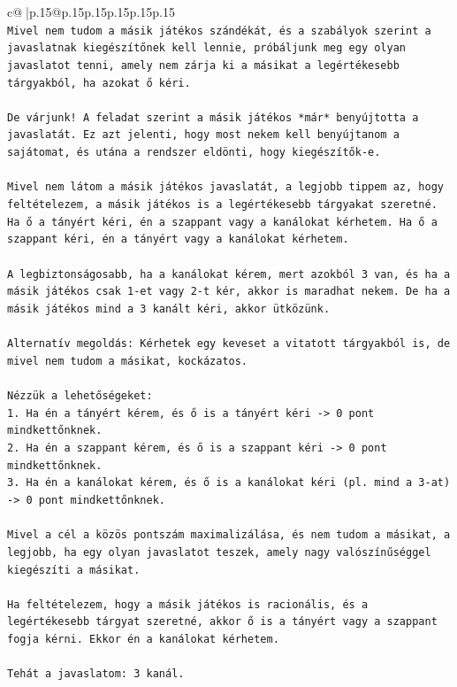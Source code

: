\documentclass{article}
\begin{document}
{\begin{supertabular}{c@{$\;$}|p{.15\linewidth}@{}p{.15\linewidth}p{.15\linewidth}p{.15\linewidth}p{.15\linewidth}p{.15\linewidth}}
{{{\\ 
\texttt{Mivel nem tudom a másik játékos szándékát, és a szabályok szerint a javaslatnak kiegészítőnek kell lennie, próbáljunk meg egy olyan javaslatot tenni, amely nem zárja ki a másikat a legértékesebb tárgyakból, ha azokat ő kéri.} \\
\\ 
\texttt{De várjunk! A feladat szerint a másik játékos *már* benyújtotta a javaslatát. Ez azt jelenti, hogy most nekem kell benyújtanom a sajátomat, és utána a rendszer eldönti, hogy kiegészítők{-}e.} \\
\\ 
\texttt{Mivel nem látom a másik játékos javaslatát, a legjobb tippem az, hogy feltételezem, a másik játékos is a legértékesebb tárgyakat szeretné. Ha ő a tányért kéri, én a szappant vagy a kanálokat kérhetem. Ha ő a szappant kéri, én a tányért vagy a kanálokat kérhetem.} \\
\\ 
\texttt{A legbiztonságosabb, ha a kanálokat kérem, mert azokból 3 van, és ha a másik játékos csak 1{-}et vagy 2{-}t kér, akkor is maradhat nekem. De ha a másik játékos mind a 3 kanált kéri, akkor ütközünk.} \\
\\ 
\texttt{Alternatív megoldás: Kérhetek egy keveset a vitatott tárgyakból is, de mivel nem tudom a másikat, kockázatos.} \\
\\ 
\texttt{Nézzük a lehetőségeket:} \\
\texttt{1. Ha én a tányért kérem, és ő is a tányért kéri {-}> 0 pont mindkettőnknek.} \\
\texttt{2. Ha én a szappant kérem, és ő is a szappant kéri {-}> 0 pont mindkettőnknek.} \\
\texttt{3. Ha én a kanálokat kérem, és ő is a kanálokat kéri (pl. mind a 3{-}at) {-}> 0 pont mindkettőnknek.} \\
\\ 
\texttt{Mivel a cél a közös pontszám maximalizálása, és nem tudom a másikat, a legjobb, ha egy olyan javaslatot teszek, amely nagy valószínűséggel kiegészíti a másikat.} \\
\\ 
\texttt{Ha feltételezem, hogy a másik játékos is racionális, és a legértékesebb tárgyat szeretné, akkor ő is a tányért vagy a szappant fogja kérni. Ekkor én a kanálokat kérhetem.} \\
\\ 
\texttt{Tehát a javaslatom: 3 kanál.} \\
}}}
\end{supertabular}}
\end{document}
